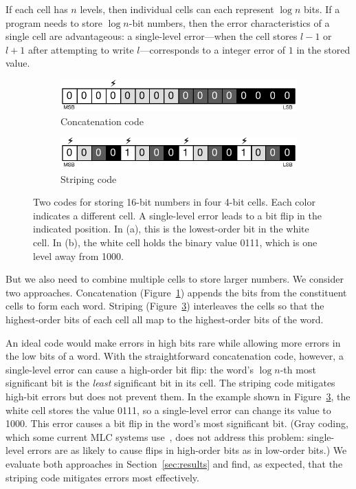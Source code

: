 \documentclass[prodmode,acmtocs]{acmsmall}
\begin{document}
If each cell has $n$ levels, then individual cells can each
represent $\log n$ bits. If a program needs to store $\log n$-bit
numbers, then the error characteristics of a single cell are
advantageous: a single-level
error---when the cell stores $l-1$ or $l+1$ after attempting to write
$l$---corresponds to a integer error of $1$ in the stored value.

\begin{figure}
    \begin{subfigure}{0.5\columnwidth}
        \centering
        \includegraphics[scale=0.65]{figs/coding-chunk}
        \caption{Concatenation code}
        \label{fig:coding-chunk}
    \end{subfigure}
    \begin{subfigure}{0.5\columnwidth}
        \centering
        \includegraphics[scale=0.65]{figs/coding-stripe}
        \caption{Striping code}
        \label{fig:coding-stripe}
    \end{subfigure}
    \caption{
        Two codes for storing 16-bit numbers in four
        4-bit cells. Each color indicates a different cell.
        A single-level error leads to a bit flip in the indicated
        position.
        In (a), this is the lowest-order bit in the white cell.
        In (b), the white cell holds the binary value 0111, which is one level
        away from 1000.
    }
\end{figure}

But we also need to combine multiple cells to store larger numbers.
We consider two approaches. Concatenation
(Figure~\ref{fig:coding-chunk}) appends the bits from the
constituent cells to form each word. Striping
(Figure~\ref{fig:coding-stripe}) interleaves the cells so that the highest-order
bits of each cell all map to the highest-order bits of the word.

An ideal code would make errors in high bits rare while allowing more errors
in the low bits of a word. With the straightforward concatenation code, however,
a single-level error can cause a high-order bit flip: the word's $\log n$-th
most significant bit is the \emph{least} significant bit in its cell.
The striping code mitigates high-bit errors but does not prevent them. In the
example shown in Figure~\ref{fig:coding-stripe}, the white cell stores the
value 0111, so a single-level error can change its value to 1000. This error
causes a bit flip in the word's most significant bit.
(Gray coding, which some current MLC systems use~\cite{improvingwrites}, does
not address this problem: single-level errors are as likely to cause flips in
high-order bits as in low-order bits.)
We evaluate both approaches in
Section~\ref{sec:results} and find, as expected, that the striping code
mitigates errors most effectively.
\end{document}
